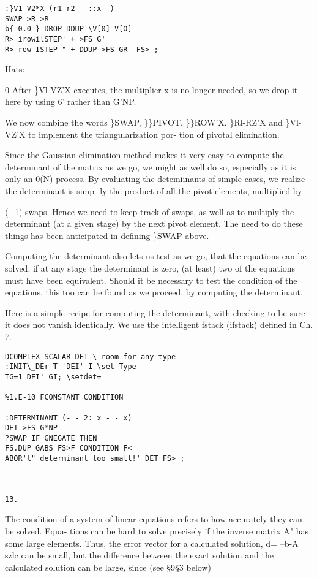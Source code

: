 {{{{{{{{{\begin{verbatim}
:}V1-V2*X (r1 r2-- ::x--)
SWAP >R >R
b{ 0.0 } DROP DDUP \V[0] V[O]
R> irowilSTEP' + >FS G'
R> row ISTEP " + DDUP >FS GR- FS> ;

\end{verbatim} 
Hats:

0 After \}Vl-VZ'X executes, the multiplier x is no longer needed,
so we drop it here by using 6' rather than G'NP.

We now combine the words \}SWAP, \}\}PIVOT, \}\}ROW'X.
\}Rl-RZ'X and \}Vl-VZ'X to implement the triangularization por-
tion of pivotal elimination.




Since the Gaussian elimination method makes it very easy to
compute the determinant of the matrix as we go, we might as well
do so, especially as it is only an 0(N) process. By evaluating the
detemiinants of simple cases, we realize the determinant is simp-
ly the product of all the pivot elements, multiplied by

(\_1) swaps. Hence we need to keep track of swaps, as well as to
multiply the determinant (at a given stage) by the next pivot
element. The need to do these things has been anticipated in
defining \}SWAP above.

Computing the determinant also lets us test as we go, that the
equations can be solved: if at any stage the determinant is zero,
(at least) two of the equations must have been equivalent. Should
it be necessary to test the condition of the equations, this too
can be found as we proceed, by computing the determinant.

Here is a simple recipe for computing the determinant, with
checking to be sure it does not vanish identically. We use the
intelligent fstack (ifstack) defined in Ch. 7.

\begin{verbatim}
DCOMPLEX SCALAR DET \ room for any type
:INIT\_DEr T 'DEI' I \set Type
TG=1 DEI' GI; \setdet=

%1.E-10 FCONSTANT CONDITION

:DETERMINANT (- - 2: x - - x)
DET >FS G*NP
?SWAP IF GNEGATE THEN
FS.DUP GABS FS>F CONDITION F<
ABOR'l" determinant too small!' DET FS> ;

 

13.
\end{verbatim} 

The condition of a system of linear equations refers to how accurately they can be solved. Equa-
tions can be hard to solve precisely if the inverse matrix A" has some large elements. Thus, the
error vector for a calculated solution, d= --b-A szlc can be small, but the difference between the
exact solution and the calculated solution can be large, since (see \S9\S3 below)

}}}}}}}}}
